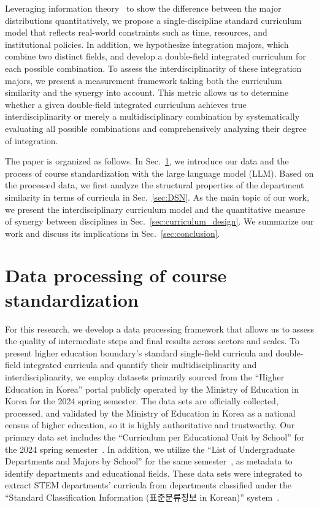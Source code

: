 \documentclass{bmcart}
\begin{document}
Leveraging information theory~\cite{Cover2006} to show the difference between the major distributions quantitatively, we propose a single-discipline standard curriculum model that reflects real-world constraints such as time, resources, and institutional policies. In addition, we hypothesize integration majors, which combine two distinct fields, and develop a double-field integrated curriculum for each possible combination. To assess the interdisciplinarity of these integration majors, we present a measurement framework 
taking both the curriculum similarity and the synergy into account. This metric allows us to determine whether a given double-field integrated curriculum achieves true interdisciplinarity or merely a multidisciplinary combination by systematically evaluating all possible combinations and comprehensively analyzing their degree of integration.

The paper is organized as follows. In Sec.~\ref{sec:data_processing}, we introduce our data and the process of course standardization with the large language model (LLM). Based on the processed data, we first analyze the structural properties of the department similarity in terms of curricula in Sec.~\ref{sec:DSN}. As the main topic of our work, we present the interdisciplinary curriculum model and the quantitative measure of synergy between disciplines in Sec.~\ref{sec:curriculum_design}. We summarize our work and discuss its implications in Sec.~\ref{sec:conclusion}.

\section{Data processing of course standardization}
\label{sec:data_processing}

For this research, we develop a data processing framework that allows us to assess the quality of intermediate steps and final results across sectors and scales. To present higher education boundary's standard single-field curricula and double-field integrated curricula and quantify their multidisciplinarity and interdisciplinarity, we employ datasets primarily sourced from the  ``Higher Education in Korea'' portal publicly operated by the Ministry of Education in Korea for the 2024 spring semester. 
The data sets are officially collected, processed, and validated by the Ministry of Education in Korea as a national census of higher education, so it is highly authoritative and trustworthy.
Our primary data set includes the  ``Curriculum per Educational Unit by School'' for the 2024 spring semester~\cite{Curriculum2024}. In addition, we utilize the  ``List of Undergraduate Departments and Majors by School'' for the same semester~\cite{Departments2024}, as metadata to identify departments and educational fields. These data sets were integrated to extract STEM departments' curricula from departments classified under the  ``Standard Classification Information (표준분류정보 in Korean)'' system~\cite{data_go_kr}.
\end{document}
